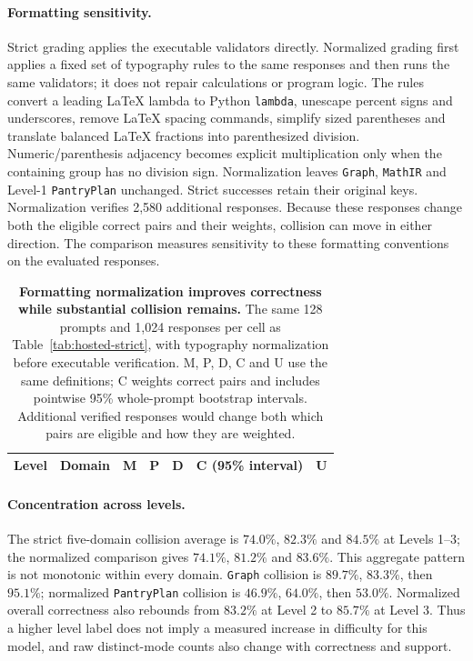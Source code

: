 \paragraph{Formatting sensitivity.}
Strict grading applies the executable validators directly. Normalized grading
first applies a fixed set of typography rules to the same responses and then
runs the same validators; it does not repair calculations or program logic.
The rules convert a leading LaTeX lambda to Python \texttt{lambda}, unescape
percent signs and underscores, remove LaTeX spacing commands, simplify sized
parentheses and translate balanced LaTeX fractions into parenthesized division.
Numeric/parenthesis adjacency becomes explicit multiplication only when the
containing group has no division sign. Normalization leaves \texttt{Graph}, \texttt{MathIR}
and Level-1 \texttt{PantryPlan} unchanged. Strict successes retain their original keys.
Normalization verifies 2,580 additional responses. Because these responses
change both the eligible correct pairs and their weights, collision can move in
either direction. The comparison measures sensitivity to these formatting
conventions on the evaluated responses.

\begin{table}[!htbp]
  \centering
  \caption{\textbf{Formatting normalization improves correctness while substantial collision remains.}
  The same 128 prompts and 1,024 responses per cell as
  Table~\ref{tab:hosted-strict}, with typography normalization before executable
  verification. M, P, D, C and U use the same definitions; C weights correct
  pairs and includes pointwise 95\% whole-prompt bootstrap intervals.
  Additional verified responses would change both which pairs are eligible and how they are weighted.}
  \label{tab:hosted-normalized}
  \small
  \setlength{\tabcolsep}{4pt}
  \begin{tabular}{@{}rlrrrrr@{}}
    \toprule
    Level & Domain & M & P & D & C (95\% interval) & U \\
    \midrule
    
  \end{tabular}
\end{table}

\paragraph{Concentration across levels.}
The strict five-domain collision average is $74.0\%$, $82.3\%$ and $84.5\%$
at Levels 1--3; the normalized comparison gives $74.1\%$, $81.2\%$ and
$83.6\%$. This aggregate pattern is not monotonic within every domain.
\texttt{Graph} collision is $89.7\%$, $83.3\%$, then $95.1\%$; normalized \texttt{PantryPlan}
collision is $46.9\%$, $64.0\%$, then $53.0\%$. Normalized overall correctness
also rebounds from $83.2\%$ at Level 2 to $85.7\%$ at Level 3. Thus a higher
level label does not imply a measured increase in difficulty for this model,
and raw distinct-mode counts also change with correctness and support.

